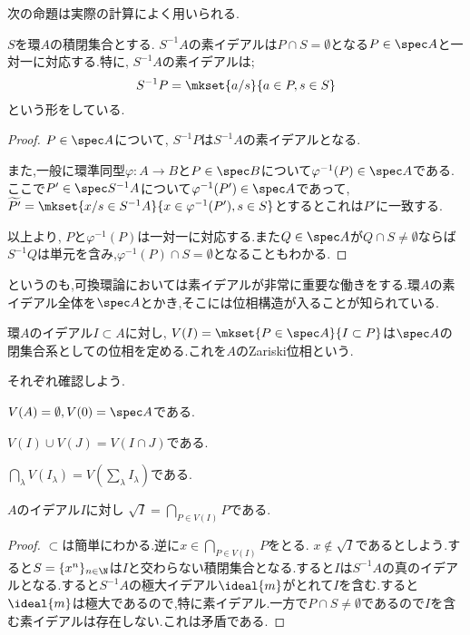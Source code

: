 次の命題は実際の計算によく用いられる.
\begin{prop}\label{prop:Spec S^-1Aの引き戻し}
	$S$を環$A$の積閉集合とする. $S^{-1}A$の素イデアルは$P\cap S=\emptyset$となる$P\in\spec A$と一対一に対応する.特に, $S^{-1}A$の素イデアルは;
	\[S^{-1}P=\mkset{a/s}{a\in P,s\in S}\]
	という形をしている.
\end{prop}
\begin{proof}
	$P\in\spec A$について, $S^{-1}P$は$S^{-1}A$の素イデアルとなる.
	
	また,一般に環準同型$\varphi:A\to B$と$P\in\spec B$について$\varphi^{-1}(P)\in\spec A$である.ここで$P'\in\spec S^{-1}A$について$\varphi^{-1}(P')\in\spec A$であって, $\widetilde{P'}=\mkset{x/s\in S^{-1}A}{x\in\varphi^{-1}(P'),s\in S}$とするとこれは$P'$に一致する.
	
	以上より, $P$と$\varphi^{-1}(P)$は一対一に対応する.また$Q\in\spec A$が$Q\cap S\neq\emptyset$ならば$S^{-1}Q$は単元を含み,$\varphi^{-1}(P)\cap S=\emptyset$となることもわかる.
\end{proof}

というのも,可換環論においては素イデアルが非常に重要な働きをする.環$A$の素イデアル全体を$\spec A$とかき,そこには位相構造が入ることが知られている.

\begin{defi}[Zariski位相]\label{defi:Zariski位相}
	環$A$のイデアル$I\subset A$に対し, $V(I)=\mkset{ P\in\spec A}{I\subset P}$は$\spec A$の閉集合系としての位相を定める.これを$A$のZariski位相という.
\end{defi}

それぞれ確認しよう.
\begin{sakura}
	\item $V(A)=\emptyset,V(0)=\spec A$である.
	\item $V(I)\cup V(J)=V(I\cap J)$である.
	\item $\bigcap_{\lambda}V(I_\lambda)=V(\sum_\lambda I_\lambda)$である.
\end{sakura}

\begin{lem}\label{lem:イデアルの根基と素イデアル}
	$A$のイデアル$I$に対し $\sqrt{I}=\bigcap_{P\in V(I)} P$である.
\end{lem}
\begin{proof}
	$\subset $は簡単にわかる.逆に$x\in\bigcap_{P\in V(I)}P$をとる. $x\not\in\sqrt{I}$であるとしよう.すると$S=\{x^n\}_{n\in\N}$は$I$と交わらない積閉集合となる.すると$I$は$S^{-1}A$の真のイデアルとなる.すると$S^{-1}A$の極大イデアル$\ideal{m}$がとれて$I$を含む.すると$\ideal{m}$は極大であるので,特に素イデアル.一方で$P\cap S\neq\emptyset$であるので$I$を含む素イデアルは存在しない.これは矛盾である.
\end{proof}

